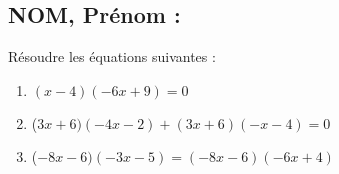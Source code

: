 \documentclass[a4paper,11pt,exos]{nsi}
\begin{document}
\subsection*{NOM, Prénom : \dotfill} 


\maketitle



\begin{exercice}
Résoudre les équations suivantes :
	\begin{enumerate}
		\item $(x-4)(-6x+9)=0$
        \item  ($3x+6)( -4x-2)+(3x+6)(-x-4)=0$
	    \item  ($-8x-6)( -3x-5)=( -8x-6)( -6x+4)$
	\end{enumerate}

\end{exercice}

\end{document}
